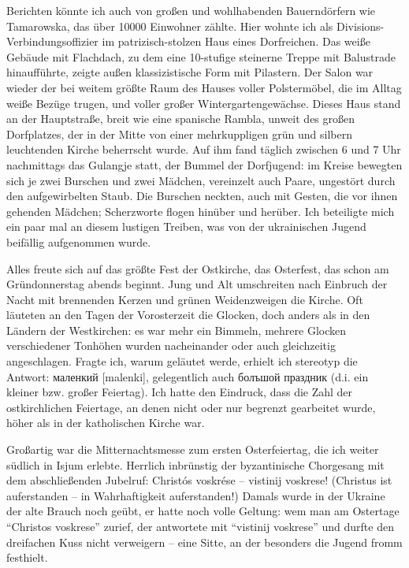 Berichten könnte ich auch von großen und wohlhabenden Bauerndörfern wie Tamarowska, das über \num{10000} Einwohner zählte. Hier wohnte ich als Divisions-Verbindungsoffizier im patrizisch-stolzen Haus eines Dorfreichen. Das weiße Gebäude mit Flachdach, zu dem eine 10-stufige steinerne Treppe mit Balustrade hinaufführte, zeigte außen klassizistische Form mit Pilastern. Der Salon war wieder der bei weitem größte Raum des Hauses voller Polstermöbel, die im Alltag weiße Bezüge trugen, und voller großer Wintergartengewächse. Dieses Haus stand an der Hauptstraße, breit wie eine spanische Rambla, unweit des großen Dorfplatzes, der in der Mitte von einer mehrkuppligen grün und silbern leuchtenden Kirche beherrscht wurde. Auf ihm fand täglich zwischen 6 und 7 Uhr nachmittags das Gulangje statt, der Bummel der Dorfjugend: im Kreise bewegten sich je zwei Burschen und zwei Mädchen, vereinzelt auch Paare, ungestört durch den aufgewirbelten Staub. Die Burschen neckten, auch mit Gesten, die vor ihnen gehenden Mädchen; Scherzworte flogen hinüber und herüber. Ich beteiligte mich ein paar mal an diesem lustigen Treiben, was von der ukrainischen Jugend beifällig aufgenommen wurde.

Alles freute sich auf das größte Fest der Ostkirche, das Osterfest, das schon am Gründonnerstag abends beginnt. Jung und Alt umschreiten nach Einbruch der Nacht mit brennenden Kerzen und grünen Weidenzweigen die Kirche. Oft läuteten an den Tagen der Vorosterzeit die Glocken, doch anders als in den Ländern der Westkirchen: es war mehr ein Bimmeln, mehrere Glocken verschiedener Tonhöhen wurden nacheinander oder auch gleichzeitig angeschlagen. Fragte ich, warum geläutet werde, erhielt ich stereotyp die Antwort: маленкий [malenki], gelegentlich auch болъшой праздник (d.i. ein kleiner bzw. großer Feiertag). Ich hatte den Eindruck, dass die Zahl der ostkirchlichen Feiertage, an denen nicht oder nur begrenzt gearbeitet wurde, höher als in der katholischen Kirche war.

Großartig war die Mitternachtsmesse zum ersten Osterfeiertag, die ich weiter südlich in Isjum erlebte. Herrlich inbrünstig der byzantinische Chorgesang mit dem abschließenden Jubelruf: Christós voskrése -- vistinij voskrese! (Christus ist auferstanden -- in Wahrhaftigkeit auferstanden!) Damals wurde in der Ukraine der alte Brauch noch geübt, er hatte noch volle Geltung: wem man am Ostertage \enquote{Christos voskrese} zurief, der antwortete mit \enquote{vistinij voskrese} und durfte den dreifachen Kuss nicht verweigern -- eine Sitte, an der besonders die Jugend fromm festhielt.

